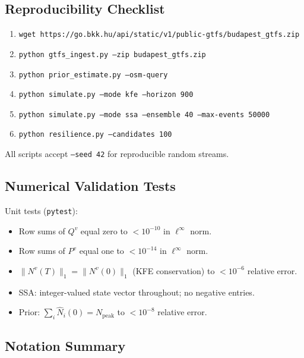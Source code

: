 \documentclass[11pt,a4paper]{article}
\theoremstyle{plain}
\theoremstyle{definition}
\theoremstyle{remark}
\begin{document}
\subsection{Reproducibility Checklist}

\begin{enumerate}
  \item \texttt{wget https://go.bkk.hu/api/static/v1/public-gtfs/budapest\_gtfs.zip}
  \item \texttt{python gtfs\_ingest.py --zip budapest\_gtfs.zip}
  \item \texttt{python prior\_estimate.py --osm-query}
  \item \texttt{python simulate.py --mode kfe --horizon 900}
  \item \texttt{python simulate.py --mode ssa --ensemble 40 --max-events 50000}
  \item \texttt{python resilience.py --candidates 100}
\end{enumerate}
All scripts accept \texttt{--seed 42} for reproducible random streams.

\subsection{Numerical Validation Tests}

Unit tests (\texttt{pytest}):
\begin{itemize}
  \item Row sums of $Q^v$ equal zero to $<10^{-10}$ in $\ell^\infty$ norm.
  \item Row sums of $P^v$ equal one to $<10^{-14}$ in $\ell^\infty$ norm.
  \item $\|N^v(T)\|_1=\|N^v(0)\|_1$ (KFE conservation) to $<10^{-6}$ relative error.
  \item SSA: integer-valued state vector throughout; no negative entries.
  \item Prior: $\sum_i\hat{N}_i(0)=N_{\mathrm{peak}}$ to $<10^{-8}$ relative error.
\end{itemize}

\subsection*{Notation Summary}
\end{document}
